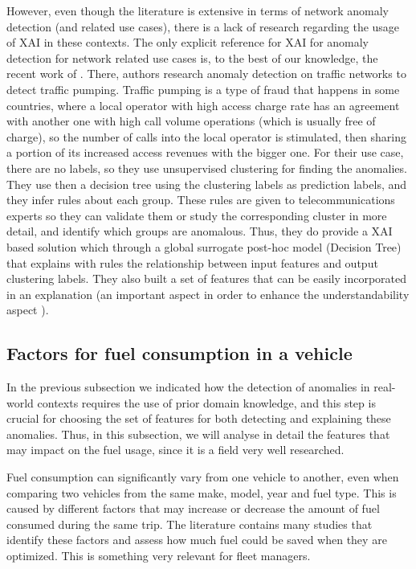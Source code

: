 However, even though the literature is extensive in terms of network anomaly detection (and related use cases), there is a lack of research regarding the usage of XAI in these contexts. The only explicit reference for XAI for anomaly detection for network related use cases is, to the best of our knowledge, the recent work of \parencite{irarrazaval2021telecom}. There, authors research anomaly detection on traffic networks to detect traffic pumping. Traffic pumping is a type of fraud that happens in some countries, where a local operator with high access charge rate has an agreement with another one with high call volume operations (which is usually free of charge), so the number of calls into the local operator is stimulated, then sharing a portion of its increased access revenues with the bigger one. For their use case, there are no labels, so they use unsupervised clustering for finding the anomalies. They use then a decision tree using the clustering labels as prediction labels, and they infer rules about each group. These rules are given to telecommunications experts so they can validate them or study the corresponding cluster in more detail, and identify which groups are anomalous. Thus, they do provide a XAI based solution which through a global surrogate post-hoc model (Decision Tree) that explains with rules the relationship between input features and output clustering labels. They also built a set of features that can be easily incorporated in an explanation (an important aspect in order to enhance the understandability aspect \parencite{arrieta2020explainable}).


\subsection{Factors for fuel consumption in a vehicle}\label{subsec:ch2-sota-fuel-factors}
In the previous subsection we indicated how the detection of anomalies in real-world contexts requires the use of prior domain knowledge, and this step is crucial for choosing the set of features for both detecting and explaining these anomalies. Thus, in this subsection, we will analyse in detail the features that may impact on the fuel usage, since it is a field very well researched.

Fuel consumption can significantly vary from one vehicle to another, even when comparing two vehicles from the same make, model, year and fuel type. This is caused by different factors that may increase or decrease the amount of fuel consumed during the same trip. The literature contains many studies that identify these factors and assess how much fuel could be saved when they are optimized. This is something very relevant for fleet managers.

